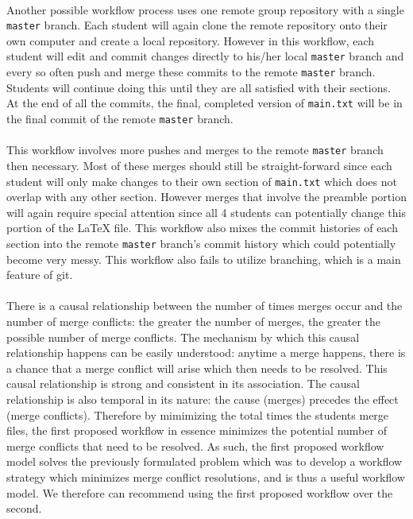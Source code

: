 \documentclass[12pt]{article}
\begin{document}
\paragraph{} Another possible workflow process uses one remote group repository with a single \texttt{master} branch. Each student will again clone the remote repository onto their own computer and create a local repository. However in this workflow, each student will edit and commit changes directly to his/her local \texttt{master} branch and every so often push and merge these commits to the remote \texttt{master} branch. Students will continue doing this until they are all satisfied with their sections. At the end of all the commits, the final, completed version of \texttt{main.txt} will be in the final commit of the remote \texttt{master} branch. 

\paragraph{} This workflow involves more pushes and merges to the remote \texttt{master} branch then necessary. Most of these merges should still be straight-forward since each student will only make changes to their own section of \texttt{main.txt} which does not overlap with any other section. However merges that involve the preamble portion will again require special attention since all 4 students can potentially change this portion of the LaTeX file. This workflow also mixes the commit histories of each section into the remote \texttt{master} branch's commit history which could potentially become very messy. This workflow also fails to utilize branching, which is a main feature of git.

\paragraph{} There is a causal relationship between the number of times merges occur and the number of merge conflicts: the greater the number of merges, the greater the possible number of merge conflicts. The mechanism by which this causal relationship happens can be easily understood: anytime a merge happens, there is a chance that a merge conflict will arise which then needs to be resolved. This causal relationship is strong and consistent in its association. The causal relationship is also temporal in its nature: the cause (merges) precedes the effect (merge conflicts). Therefore by mimimizing the total times the students merge files, the first proposed workflow in essence minimizes the potential number of merge conflicts that need to be resolved. As such, the first proposed workflow model solves the previously formulated problem which was to develop a workflow strategy which minimizes merge conflict resolutions, and is thus a useful workflow model. We therefore can recommend using the first proposed workflow over the second.
\end{document}
